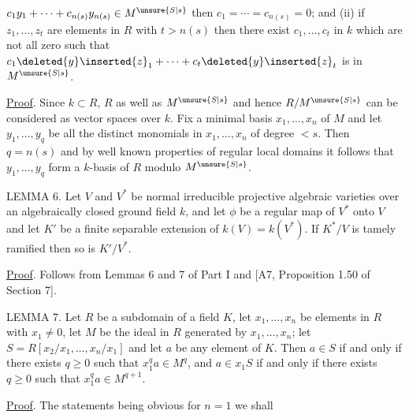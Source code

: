 $c_1y_1+\cdots+c_{n(s)}y_{n(s)}\in M^{\unsure{S|s}}$ then $c_1=\cdots=c_{n(s)}=0$; and (ii) if $z_1,\ldots,z_t$ are elements in $R$ with $t>n(s)$ then there exist $c_1,\ldots,c_t$ in $k$ which are not all zero such that $c_1\deleted{y}\inserted{z}_1+\cdots+c_t\deleted{y}\inserted{z}_t$ is in $M^{\unsure{S|s}}$.

\uline{Proof}. Since $k\subset R$, $R$ as well as $M^{\unsure{S|s}}$ and hence $R/M^{\unsure{S|s}}$ can be considered as vector spaces over $k$. Fix a minimal basis $x_1,\ldots,x_n$ of $M$ and let $y_1,\ldots,y_q$ be all the distinct monomials in $x_1,\ldots,x_n$ of degree $<s$. Then $q=n(s)$ and by well known properties of regular local domains it follows that $y_1,\ldots,y_q$ form a $k$-basis of $R$ modulo $M^{\unsure{S|s}}$.

LEMMA 6. Let $V$ and $V^*$ be normal irreducible projective algebraic varieties over an algebraically closed ground field $k$, and let $\phi$ be a regular  map of $V^*$ onto $V$ and let $K'$ be a finite separable extension of $k(V)=k(V^*)$. If $K^*/V$ is tamely ramified then so is $K'/V^*$.

\uline{Proof}. Follows from Lemmas 6 and 7 of Part I and [A7, Proposition 1.50 of Section 7].

LEMMA 7. Let $R$ be a subdomain of a field $K$, let $x_1,\ldots,x_n$ be elements in $R$ with $x_1\ne0$, let $M$ be the ideal in $R$ generated by $x_1,\ldots,x_n$; let $S=R[x_2/x_1,\ldots,x_n/x_1]$ and let $a$ be any element of $K$. Then $a\in S$ if and only if there exists $q\geq0$ such that $x_1^qa\in M^q$, and $a\in x_1S$ if and only if there exists $q\geq0$ such that $x_1^qa\in M^{q+1}$.

\uline{Proof}. The statements being obvious for $n=1$ we shall
